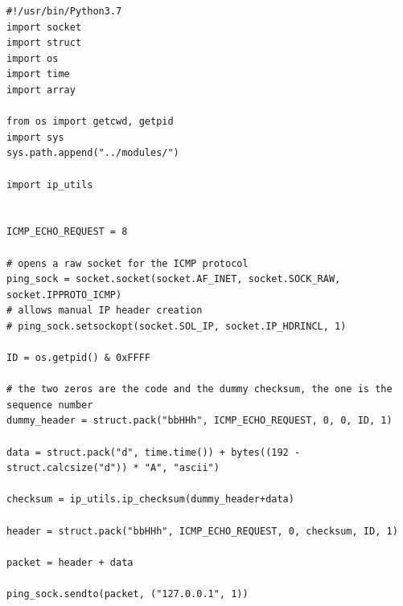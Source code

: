 \documentclass[titlepage]{article}
\begin{document}
\begin{lstlisting}[label=echosend,caption=\textit{A prototype for sending \gls{icmp} ECHO REQUEST packets.}]
#!/usr/bin/Python3.7
import socket
import struct
import os
import time
import array

from os import getcwd, getpid
import sys
sys.path.append("../modules/")

import ip_utils


ICMP_ECHO_REQUEST = 8

# opens a raw socket for the ICMP protocol
ping_sock = socket.socket(socket.AF_INET, socket.SOCK_RAW, socket.IPPROTO_ICMP)
# allows manual IP header creation
# ping_sock.setsockopt(socket.SOL_IP, socket.IP_HDRINCL, 1)

ID = os.getpid() & 0xFFFF

# the two zeros are the code and the dummy checksum, the one is the sequence number
dummy_header = struct.pack("bbHHh", ICMP_ECHO_REQUEST, 0, 0, ID, 1)

data = struct.pack("d", time.time()) + bytes((192 - struct.calcsize("d")) * "A", "ascii")

checksum = ip_utils.ip_checksum(dummy_header+data)

header = struct.pack("bbHHh", ICMP_ECHO_REQUEST, 0, checksum, ID, 1)

packet = header + data

ping_sock.sendto(packet, ("127.0.0.1", 1))
\end{lstlisting}

\begin{algorithm}
\begin{algorithmic}[1]
\end{algorithmic}
\caption{\textit{%
  Psuedocode for the code in Listing~\ref{echorecv}.
}}
\end{algorithm}
\end{document}

